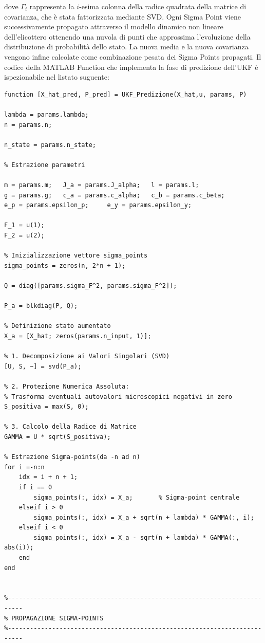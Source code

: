 \documentclass[12pt,a4paper]{article}
\begin{document}
dove $\Gamma_i$ rappresenta la $i$-esima colonna della radice quadrata della matrice di covarianza, che è stata fattorizzata mediante SVD.
Ogni Sigma Point viene successivamente propagato attraverso il modello dinamico non lineare dell'elicottero ottenendo una nuvola di punti che approssima l'evoluzione della distribuzione di probabilità dello stato.
La nuova media e la nuova covarianza vengono infine calcolate come combinazione pesata dei Sigma Points propagati.
Il codice della MATLAB Function che implementa la fase di predizione dell'UKF è ispezionabile nel listato suguente:
\newline
\begin{lstlisting}[style=matlabstyle, caption={Blocco di predizione dell'UKF}, label={lst:predizione_ukf}]
function [X_hat_pred, P_pred] = UKF_Predizione(X_hat,u, params, P)

lambda = params.lambda;
n = params.n;

n_state = params.n_state;

% Estrazione parametri

m = params.m;   J_a = params.J_alpha;   l = params.l;
g = params.g;   c_a = params.c_alpha;   c_b = params.c_beta;
e_p = params.epsilon_p;     e_y = params.epsilon_y;

F_1 = u(1);
F_2 = u(2);

% Inizializzazione vettore sigma_points
sigma_points = zeros(n, 2*n + 1);

Q = diag([params.sigma_F^2, params.sigma_F^2]);

P_a = blkdiag(P, Q);

% Definizione stato aumentato
X_a = [X_hat; zeros(params.n_input, 1)];

% 1. Decomposizione ai Valori Singolari (SVD)
[U, S, ~] = svd(P_a); 

% 2. Protezione Numerica Assoluta: 
% Trasforma eventuali autovalori microscopici negativi in zero
S_positiva = max(S, 0); 

% 3. Calcolo della Radice di Matrice
GAMMA = U * sqrt(S_positiva);

% Estrazione Sigma-points(da -n ad n)
for i =-n:n
    idx = i + n + 1;
    if i == 0      
        sigma_points(:, idx) = X_a;       % Sigma-point centrale
    elseif i > 0
        sigma_points(:, idx) = X_a + sqrt(n + lambda) * GAMMA(:, i);
    elseif i < 0
        sigma_points(:, idx) = X_a - sqrt(n + lambda) * GAMMA(:, abs(i));
    end
end


%--------------------------------------------------------------------------
% PROPAGAZIONE SIGMA-POINTS
%--------------------------------------------------------------------------


\end{lstlisting}
\end{document}
